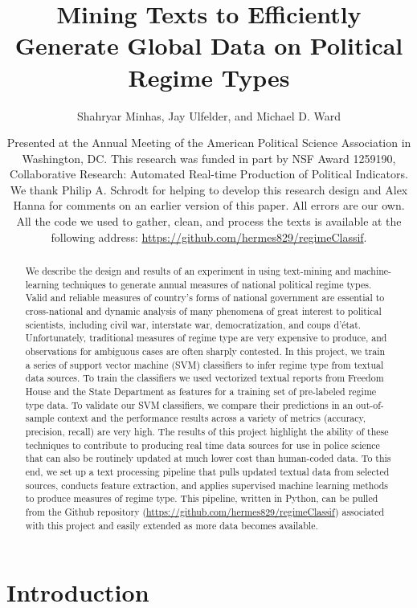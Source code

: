 \documentclass[pdftex,12pt,fullpage,oneside]{amsart}
\title{Mining Texts to Efficiently Generate Global Data on Political Regime Types}
\author{Shahryar Minhas, Jay Ulfelder, and Michael D. Ward}
\date{Presented at the Annual Meeting of the American Political Science Association in Washington, DC. This research was funded in part by NSF Award 1259190, Collaborative Research: Automated Real-time Production of Political Indicators. We thank Philip A. Schrodt for helping to develop this research design and Alex Hanna for comments on an earlier version of this paper. All errors are our own. All the code we used to gather, clean, and process the texts is available at the following address: \url{https://github.com/hermes829/regimeClassif}.}
\begin{document}
\maketitle

\singlespacing
\begin{abstract}
We describe the design and results of an experiment in using text-mining and machine-learning techniques to generate annual measures of national political regime types. Valid and reliable measures of country's forms of national government are essential to cross-national and dynamic analysis of many phenomena of great interest to political scientists, including civil war, interstate war, democratization, and coups d'\'{e}tat. Unfortunately, traditional measures of regime type are very expensive to produce, and observations for ambiguous cases are often sharply contested. In this project, we train a series of support vector machine (SVM) classifiers to infer regime type from textual data sources. To train the classifiers we used vectorized textual reports from Freedom House and the State Department as features for a training set of pre-labeled regime type data. To validate our SVM classifiers, we compare their predictions in an out-of-sample context and the performance results across a variety of metrics (accuracy, precision, recall) are very high. The results of this project highlight the ability of these techniques to contribute to producing real time data sources for use in police science that can also be routinely updated at much lower cost than human-coded data. To this end, we set up a text processing pipeline that pulls updated textual data from selected sources, conducts feature extraction, and applies supervised machine learning methods to produce measures of regime type. This pipeline, written in Python, can be pulled from the Github repository (\url{https://github.com/hermes829/regimeClassif}) associated with this project and easily extended as more data becomes available.
\end{abstract} 

\newpage
\newpage\setcounter{page}{1} 
\doublespacing

\section{Introduction}
\end{document}
